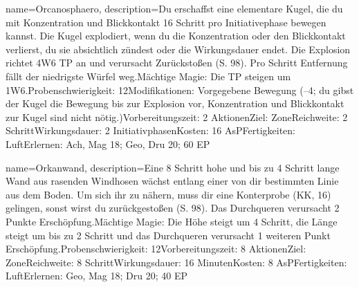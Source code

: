 {
    name={Orcanosphaero},
    description={Du erschaffst eine elementare Kugel, die du mit Konzentration und Blickkontakt 16 Schritt pro Initiativephase bewegen kannst. Die Kugel explodiert, wenn du die Konzentration oder den Blickkontakt verlierst, du sie absichtlich zündest oder die Wirkungsdauer endet. Die Explosion richtet 4W6 TP an und verursacht Zurückstoßen (S. 98). Pro Schritt Entfernung fällt der niedrigste Würfel weg.\newline Mächtige Magie: Die TP steigen um 1W6.\newline Probenschwierigkeit: 12\newline Modifikationen: Vorgegebene Bewegung (–4; du gibst der Kugel die Bewegung bis zur Explosion vor, Konzentration und Blickkontakt zur Kugel sind nicht nötig.)\newline Vorbereitungszeit: 2 Aktionen\newline Ziel: Zone\newline Reichweite: 2 Schritt\newline Wirkungsdauer: 2 Initiativphasen\newline Kosten: 16 AsP\newline Fertigkeiten: Luft\newline Erlernen: Ach, Mag 18; Geo, Dru 20; 60 EP}
}


{
    name={Orkanwand},
    description={Eine 8 Schritt hohe und bis zu 4 Schritt lange Wand aus rasenden Windhosen wächst entlang einer von dir bestimmten Linie aus dem Boden. Um sich ihr zu nähern, muss dir eine Konterprobe (KK, 16)  gelingen, sonst wirst du zurückgestoßen (S. 98). Das Durchqueren verursacht 2 Punkte Erschöpfung.\newline Mächtige Magie: Die Höhe steigt um 4 Schritt, die Länge steigt um bis zu 2 Schritt und das Durchqueren verursacht 1 weiteren Punkt Erschöpfung.\newline Probenschwierigkeit: 12\newline Vorbereitungszeit: 8 Aktionen\newline Ziel: Zone\newline Reichweite: 8 Schritt\newline Wirkungsdauer: 16 Minuten\newline Kosten: 8 AsP\newline Fertigkeiten: Luft\newline Erlernen: Geo, Mag 18; Dru 20; 40 EP}
}


